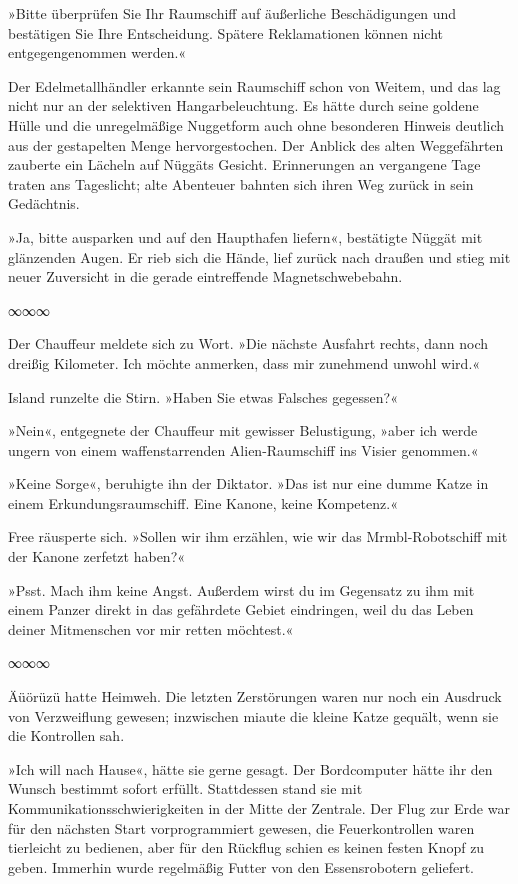 »Bitte überprüfen Sie Ihr Raumschiff auf äußerliche Beschädigungen und bestätigen Sie Ihre Entscheidung. Spätere Reklamationen können nicht entgegengenommen werden.«

Der Edelmetallhändler erkannte sein Raumschiff schon von Weitem, und das lag nicht nur an der selektiven Hangarbeleuchtung. Es hätte durch seine goldene Hülle und die unregelmäßige Nuggetform auch ohne besonderen Hinweis deutlich aus der gestapelten Menge hervorgestochen. Der Anblick des alten Weggefährten zauberte ein Lächeln auf Nüggäts Gesicht. Erinnerungen an vergangene Tage traten ans Tageslicht; alte Abenteuer bahnten sich ihren Weg zurück in sein Gedächtnis.

»Ja, bitte ausparken und auf den Haupthafen liefern«, bestätigte Nüggät mit glänzenden Augen. Er rieb sich die Hände, lief zurück nach draußen und stieg mit neuer Zuversicht in die gerade eintreffende Magnetschwebebahn.

\begin{center}
∞∞∞
\end{center}

Der Chauffeur meldete sich zu Wort. »Die nächste Ausfahrt rechts, dann noch dreißig Kilometer. Ich möchte anmerken, dass mir zunehmend unwohl wird.«

Island runzelte die Stirn. »Haben Sie etwas Falsches gegessen?«

»Nein«, entgegnete der Chauffeur mit gewisser Belustigung, »aber ich werde ungern von einem waffenstarrenden Alien-Raumschiff ins Visier genommen.«

»Keine Sorge«, beruhigte ihn der Diktator. »Das ist nur eine dumme Katze in einem Erkundungsraumschiff. Eine Kanone, keine Kompetenz.«

Free räusperte sich. »Sollen wir ihm erzählen, wie wir das Mrmbl-Robotschiff mit der Kanone zerfetzt haben?«

»Psst. Mach ihm keine Angst. Außerdem wirst du im Gegensatz zu ihm mit einem Panzer direkt in das gefährdete Gebiet eindringen, weil du das Leben deiner Mitmenschen vor mir retten möchtest.«

\begin{center}
∞∞∞
\end{center}

Äüörüzü hatte Heimweh. Die letzten Zerstörungen waren nur noch ein Ausdruck von Verzweiflung gewesen; inzwischen miaute die kleine Katze gequält, wenn sie die Kontrollen sah.

»Ich will nach Hause«, hätte sie gerne gesagt. Der Bordcomputer hätte ihr den Wunsch bestimmt sofort erfüllt. Stattdessen stand sie mit Kommunikationsschwierigkeiten in der Mitte der Zentrale. Der Flug zur Erde war für den nächsten Start vorprogrammiert gewesen, die Feuerkontrollen waren tierleicht zu bedienen, aber für den Rückflug schien es keinen festen Knopf zu geben. Immerhin wurde regelmäßig Futter von den Essensrobotern geliefert.

